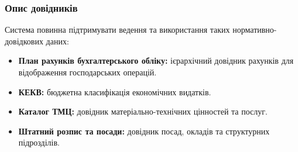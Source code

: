 \documentclass{article}
\begin{document}
\subsubsection{Опис довідників}
Система повинна підтримувати ведення та використання таких нормативно-довідкових даних:
\begin{itemize}
    \item \textbf{План рахунків бухгалтерського обліку:} ієрархічний довідник рахунків для відображення господарських операцій.
    \item \textbf{КЕКВ:} бюджетна класифікація економічних видатків.
    \item \textbf{Каталог ТМЦ:} довідник матеріально-технічних цінностей та послуг.
    \item \textbf{Штатний розпис та посади:} довідник посад, окладів та структурних підрозділів.
\end{itemize}
\end{document}
